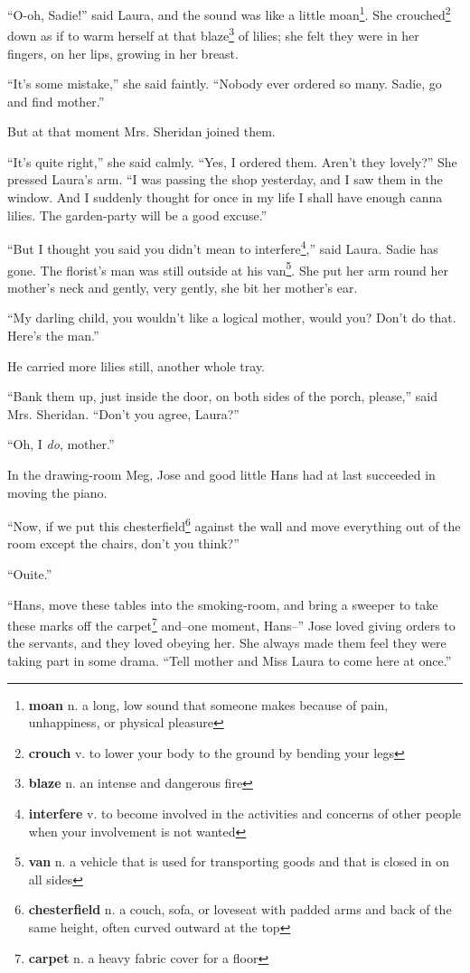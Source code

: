 ``O-oh, Sadie!'' said Laura, and the sound was like a little moan\footnote{\textbf{moan} n. a long, low sound that someone makes because of pain, unhappiness, or physical pleasure}. She crouched\footnote{\textbf{crouch} v. to lower your body to the ground by bending your legs} down as if to warm herself at that blaze\footnote{\textbf{blaze} n. an intense and dangerous fire} of lilies; she felt they were in her fingers, on her lips, growing in her breast.

``It's some mistake,'' she said faintly. ``Nobody ever ordered so many. Sadie, go and find mother.''

But at that moment Mrs. Sheridan joined them.

``It's quite right,'' she said calmly. ``Yes, I ordered them. Aren't they lovely?'' She pressed Laura's arm. ``I was passing the shop yesterday, and I saw them in the window. And I suddenly thought for once in my life I shall have enough canna lilies. The garden-party will be a good excuse.''

``But I thought you said you didn't mean to interfere\footnote{\textbf{interfere} v. to become involved in the activities and concerns of other people when your involvement is not wanted},'' said Laura. Sadie has gone. The florist's man was still outside at his van\footnote{\textbf{van} n. a vehicle that is used for transporting goods and that is closed in on all sides}. She put her arm round her mother's neck and gently, very gently, she bit her mother's ear.

``My darling child, you wouldn't like a logical mother, would you? Don't do that. Here's the man.''

He carried more lilies still, another whole tray.

``Bank them up, just inside the door, on both sides of the porch, please,'' said Mrs. Sheridan. ``Don't you agree, Laura?''

``Oh, I \textit{do}, mother.''

In the drawing-room Meg, Jose and good little Hans had at last succeeded in moving the piano.

``Now, if we put this chesterfield\footnote{\textbf{chesterfield} n. a couch, sofa, or loveseat with padded arms and back of the same height, often curved outward at the top} against the wall and move everything out of the room except the chairs, don't you think?''

``Ouite.''

``Hans, move these tables into the smoking-room, and bring a sweeper to take these marks off the carpet\footnote{\textbf{carpet} n. a heavy fabric cover for a floor} and--one moment, Hans--'' Jose loved giving orders to the servants, and they loved obeying her. She always made them feel they were taking part in some drama. ``Tell mother and Miss Laura to come here at once.''

